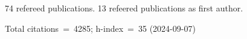 74 refereed publications. 13 refeered publications as first author.

Total citations~=~4285; h-index~=~35 (2024-09-07)